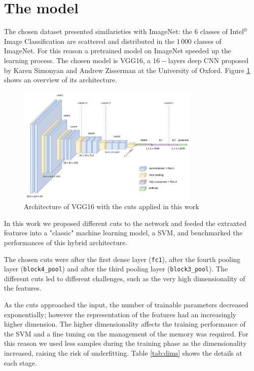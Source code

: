 \documentclass[compsoc]{IEEEtran}
\begin{document}
\section{The model} 
The chosen dataset presented similarieties with ImageNet: the $6$ classes of Intel$^\circledR$ Image Classification are scattered and distributed in the $1\,000$ classes of ImageNet. For this reason a pretrained model on ImageNet speeded up the learning process. The chosen model is VGG16, a $16-$layers deep CNN proposed by Karen Simonyan and Andrew Zisserman at the University of Oxford\cite{vgg16}. Figure \ref{fig:vgg16} shows an overview of its architecture.



\begin{figure}[ht!]
\centering                                                                        
\includegraphics[width=3.5in]{../images/vgg16.png}
\captionsetup{justification=centering}                                                                                         
\caption{Architecture of VGG16 with the cuts applied in this work}
\label{fig:vgg16}                                                                                                                               
\end{figure}

In this work we proposed different cuts to the network and feeded the extraxted features into a "classic" machine learning model, a SVM, and benchmarked the performances of this hybrid architecture. \par

The chosen cuts were after the first dense layer (\texttt{fc1}), after the fourth pooling layer (\texttt{block4\_pool}) 
and after the third pooling layer (\texttt{block3\_pool}). The different cuts led to different challenges, such as the very high dimensionality of the features.


As the cuts approached the input, the number of trainable parameters decreased exponentially; however the representation of the features had an increasingly higher dimension. The higher dimensionality affects the training performance of the SVM and a fine tuning on the management of the memory was required. For this reason we used less samples during the training phase as the dimensionality increased, raising the risk of underfitting. Table \ref{tab:dims} shows the details at each stage.
\end{document}
